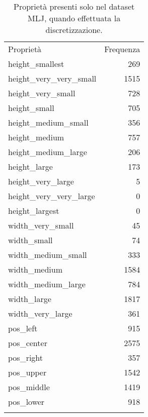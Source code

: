 \begin{table}[h!tbp]
\centering
\label{tab:frequenzaPredicat}
\small\begin{tabular}{lr}
\toprule
\addlinespace
Proprietà & Frequenza \\
\addlinespace
\midrule
\addlinespace
height\_smallest & 269 \\
height\_very\_very\_small & 1515 \\
height\_very\_small & 728 \\
height\_small & 705 \\
height\_medium\_small & 356 \\
height\_medium & 757 \\
height\_medium\_large & 206 \\
height\_large & 173 \\
height\_very\_large & 5 \\
height\_very\_very\_large & 0 \\
height\_largest & 0 \\
width\_very\_small & 45 \\
width\_small & 74 \\
width\_medium\_small & 333 \\
width\_medium & 1584 \\
width\_medium\_large & 784 \\
width\_large & 1817 \\
width\_very\_large & 361 \\
pos\_left & 915 \\
pos\_center & 2575 \\
pos\_right & 357 \\
pos\_upper & 1542 \\
pos\_middle & 1419 \\
pos\_lower & 918 \\
\addlinespace
\bottomrule
\end{tabular}
\caption{Proprietà presenti solo nel dataset MLJ, quando effettuata la discretizzazione.}
\end{table}